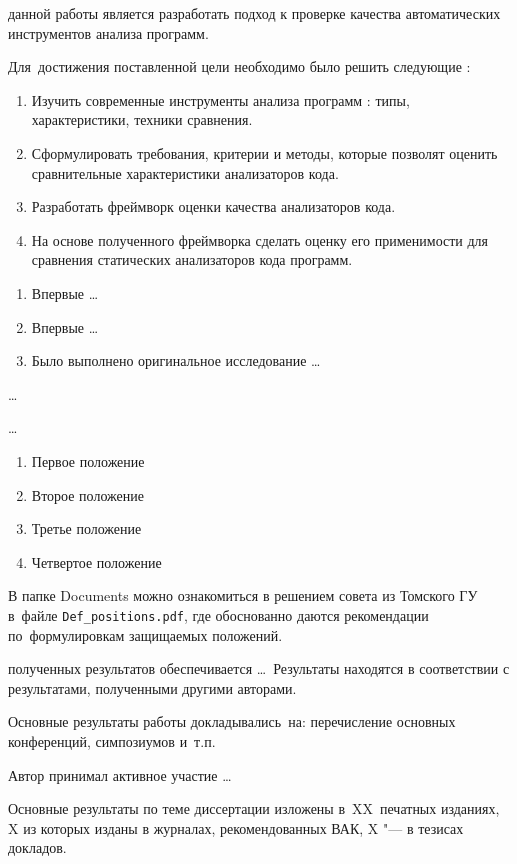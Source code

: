 {\aim} данной работы является разработать подход к проверке качества автоматических инструментов анализа программ.

Для~достижения поставленной цели необходимо было решить следующие {\tasks}:
\begin{enumerate}[beginpenalty=10000] %
  \item Изучить современные инструменты анализа программ : типы, характеристики, техники сравнения.  
  \item Сформулировать требования, критерии и методы, которые позволят оценить сравнительные характеристики 
      анализаторов кода.
  \item Разработать фреймворк оценки качества анализаторов кода. 
  \item На основе полученного фреймворка сделать оценку его применимости для сравнения статических анализаторов кода программ.
\end{enumerate}


{\novelty}
\begin{enumerate}[beginpenalty=10000] %
  \item Впервые \ldots
  \item Впервые \ldots
  \item Было выполнено оригинальное исследование \ldots
\end{enumerate}

{\influence} \ldots

{\methods} \ldots

{}
\begin{enumerate}[beginpenalty=10000] %
  \item Первое положение
  \item Второе положение
  \item Третье положение
  \item Четвертое положение
\end{enumerate}
В папке Documents можно ознакомиться в решением совета из Томского ГУ
в~файле \verb+Def_positions.pdf+, где обоснованно даются рекомендации
по~формулировкам защищаемых положений.

{\reliability} полученных результатов обеспечивается \ldots \ Результаты находятся в соответствии с результатами, полученными другими авторами.


{\probation}
Основные результаты работы докладывались~на:
перечисление основных конференций, симпозиумов и~т.\:п.

{\contribution} Автор принимал активное участие \ldots

{%
    {\publications} Основные результаты по теме диссертации изложены
    в~XX~печатных изданиях,
    X из которых изданы в журналах, рекомендованных ВАК,
    X "--- в тезисах докладов.
}%


